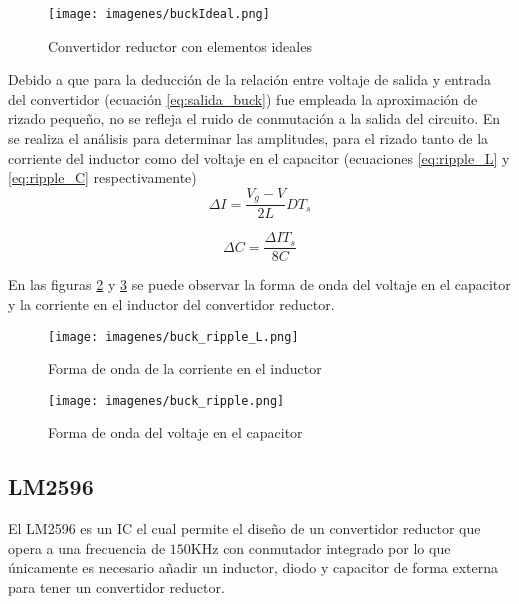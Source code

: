 \begin{figure}[H]
    \centering
    \texttt{[image: imagenes/buckIdeal.png]}
    \caption{Convertidor reductor con elementos ideales \cite{erickson_fundamentals_2020}}
    \label{fig:buck}
\end{figure}

Debido a que para la deducción de la relación entre voltaje de salida y 
entrada del convertidor (ecuación \ref{eq:salida_buck}) fue empleada la
aproximación de rizado pequeño, no se refleja el ruido de conmutación 
a la salida del circuito. En \cite{erickson_fundamentals_2020} se 
realiza el análisis para determinar las amplitudes, para el rizado tanto de 
la corriente del inductor como del voltaje en el capacitor (ecuaciones 
\ref{eq:ripple_L} y \ref{eq:ripple_C} respectivamente)
\begin{equation}
    \Delta I = \frac{V_g-V}{2L}DT_s
    \label{eq:ripple_L}
\end{equation}

\begin{equation}
    \Delta C = \frac{\Delta I T_s}{8C}
    \label{eq:ripple_C}
\end{equation}

En las figuras \ref{fig:ripple_L} y \ref{fig:ripple_C} se puede observar la forma de onda del voltaje
en el capacitor y la corriente en el inductor del convertidor reductor.

\begin{figure}[H]
    \centering
    \texttt{[image: imagenes/buck\_ripple\_L.png]}
    \caption{Forma de onda de la corriente en el inductor \cite{erickson_fundamentals_2020}}
    \label{fig:ripple_L}
\end{figure}

\begin{figure} [H]
    \centering
    \texttt{[image: imagenes/buck\_ripple.png]}
    \caption{Forma de onda del voltaje en el capacitor \cite{erickson_fundamentals_2020}}
    \label{fig:ripple_C}
\end{figure}

\subsection{LM2596}

 El LM2596 es un IC el cual permite el diseño de un convertidor reductor que opera a una 
 frecuencia de $150\text{KHz}$ con conmutador integrado
por lo que únicamente es necesario añadir un inductor, diodo y capacitor de 
 forma externa para tener un convertidor reductor. 
 
